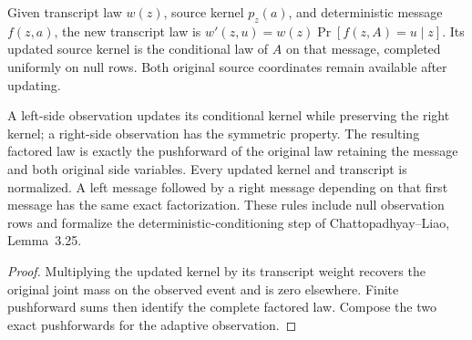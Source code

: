 \begin{definition}
  \label{def:lowerbounds-algebraic-observed-transcript}
  \leanok
  Given transcript law $w(z)$, source kernel $p_z(a)$, and deterministic
  message $f(z,a)$, the new transcript law is
  $w'(z,u)=w(z)\Pr[f(z,A)=u\mid z]$. Its updated source kernel is the
  conditional law of $A$ on that message, completed uniformly on null
  rows. Both original source coordinates remain available after updating.
\end{definition}

\begin{theorem}
  \label{thm:lowerbounds-algebraic-observed-transcript}
  \leanok
  A left-side observation updates its conditional kernel while preserving
  the right kernel; a right-side observation has the symmetric property.
  The resulting factored law is exactly the pushforward of the original
  law retaining the message and both original side variables. Every
  updated kernel and transcript is normalized. A left message followed
  by a right message depending on that first message has the same exact
  factorization. These rules include null observation rows and formalize
  the deterministic-conditioning step of Chattopadhyay--Liao, Lemma~3.25.
\end{theorem}
\begin{proof}
  \leanok
  Multiplying the updated kernel by its transcript weight recovers the
  original joint mass on the observed event and is zero elsewhere.
  Finite pushforward sums then identify the complete factored law.
  Compose the two exact pushforwards for the adaptive observation.
\end{proof}

